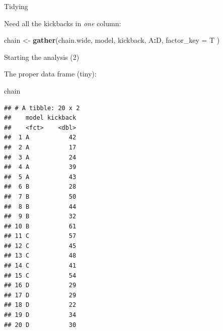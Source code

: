 \documentclass[ignorenonframetext,]{beamer}
\newenvironment{Shaded}{\begin{snugshade}}{\end{snugshade}}
\newcommand{\DataTypeTok}[1]{\textcolor[rgb]{0.13,0.29,0.53}{#1}}
\newcommand{\KeywordTok}[1]{\textcolor[rgb]{0.13,0.29,0.53}{\textbf{#1}}}
\newcommand{\NormalTok}[1]{#1}
\newcommand{\OperatorTok}[1]{\textcolor[rgb]{0.81,0.36,0.00}{\textbf{#1}}}
\newcommand{\StringTok}[1]{\textcolor[rgb]{0.31,0.60,0.02}{#1}}
\begin{document}
\begin{frame}[fragile]{Tidying}
\protect\hypertarget{tidying}{}

Need all the kickbacks in \emph{one} column:

\begin{Shaded}
\begin{Highlighting}[]
\NormalTok{chain <-}\StringTok{ }\KeywordTok{gather}\NormalTok{(chain.wide, model, kickback, A}\OperatorTok{:}\NormalTok{D,}
  \DataTypeTok{factor_key =}\NormalTok{ T}
\NormalTok{)}
\end{Highlighting}
\end{Shaded}

\end{frame}

\begin{frame}[fragile]{Starting the analysis (2)}
\protect\hypertarget{starting-the-analysis-2}{}

The proper data frame (tiny):

\tiny

\begin{Shaded}
\begin{Highlighting}[]
\NormalTok{chain }
\end{Highlighting}
\end{Shaded}

\begin{verbatim}
## # A tibble: 20 x 2
##    model kickback
##    <fct>    <dbl>
##  1 A           42
##  2 A           17
##  3 A           24
##  4 A           39
##  5 A           43
##  6 B           28
##  7 B           50
##  8 B           44
##  9 B           32
## 10 B           61
## 11 C           57
## 12 C           45
## 13 C           48
## 14 C           41
## 15 C           54
## 16 D           29
## 17 D           29
## 18 D           22
## 19 D           34
## 20 D           30
\end{verbatim}

\normalsize

\end{frame}
\end{document}
